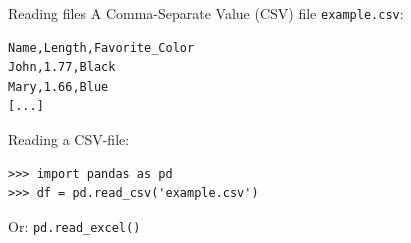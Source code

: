 \documentclass[aspectratio=169,usenames,dvipsnames]{beamer}
\begin{document}























\begin{frame}[fragile]{Reading files}
A Comma-Separate Value (CSV) file \texttt{example.csv}:

\begin{lstlisting}[style=plain]
Name,Length,Favorite_Color
John,1.77,Black
Mary,1.66,Blue
[...]
\end{lstlisting}

Reading a CSV-file:
\begin{lstlisting}
>>> import pandas as pd
>>> df = pd.read_csv('example.csv')
\end{lstlisting}

Or: \texttt{pd.read\_excel()}
\end{frame}
\end{document}
